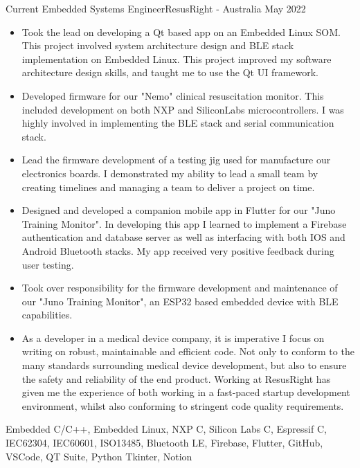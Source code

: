 %
%
%
\begin{experiences}
	\experience
	{Current}	{Embedded Systems Engineer}{ResusRight - Australia}
	{May 2022}	{
		\begin{itemize}
			\item Took the lead on developing a Qt based app on an Embedded Linux SOM. This project involved system architecture design and BLE stack implementation on Embedded Linux. This project improved my software architecture design skills, and taught me to use the Qt UI framework.
			\item Developed firmware for our "Nemo" clinical resuscitation monitor. This included development on both NXP and SiliconLabs microcontrollers. I was highly involved in implementing the BLE stack and serial communication stack.
			\item Lead the firmware development of a testing jig used for manufacture our electronics boards. I demonstrated my ability to lead a small team by creating timelines and managing a team to deliver a project on time.
			\item Designed and developed a companion mobile app in Flutter for our "Juno Training Monitor". In developing this app I learned to implement a Firebase authentication and database server as well as interfacing with both IOS and Android Bluetooth stacks. My app received very positive feedback during user testing.
			\item Took over responsibility for the firmware development and maintenance of our "Juno Training Monitor", an ESP32 based embedded device with BLE capabilities. 
			\item As a developer in a medical device company, it is imperative I focus on writing on robust, maintainable and efficient code. Not only to conform to the many standards surrounding medical device development, but also to ensure the safety and reliability of the end product. Working at ResusRight has given me the experience of both working in a fast-paced startup development environment, whilst also conforming to stringent code quality requirements.
		\end{itemize}
	}
	{Embedded C/C++, Embedded Linux, NXP \mu C, Silicon Labs \mu C, Espressif \mu C, IEC62304, IEC60601, ISO13485, Bluetooth LE, Firebase, Flutter, GitHub, VSCode, QT Suite, Python Tkinter, Notion}

\end{experiences}
